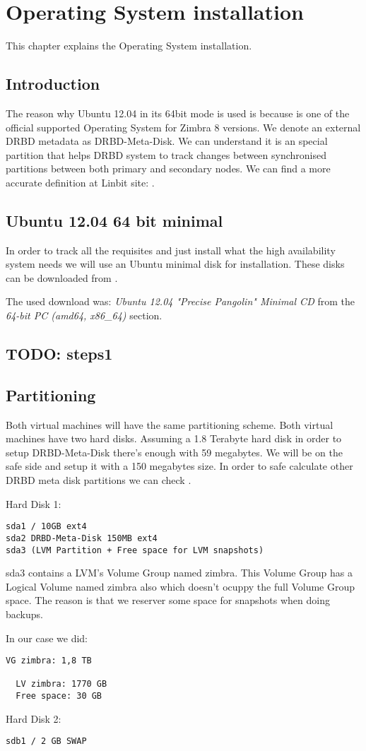 

\chapter{Operating System installation}
This chapter explains the Operating System installation.

\section {Introduction}
The reason why Ubuntu 12.04 in its 64bit mode is used is because is one of the official supported Operating System for Zimbra 8 versions. We denote an external DRBD metadata as DRBD-Meta-Disk. We can understand it is an special partition that helps DRBD system to track changes between synchronised partitions between both primary and secondary nodes. We can find a more accurate definition at Linbit site: \cite{LinbitDRBDInternals}.

\section {Ubuntu 12.04 64 bit minimal}
In order to track all the requisites and just install what the high availability system needs we will use an Ubuntu minimal disk for installation. These disks can be downloaded from \cite{UbuntuMinimalDisk}.

The used download was: \textit{Ubuntu 12.04 "Precise Pangolin" Minimal CD} from the \textit{64-bit PC (amd64, x86\_64)} section. 

\section {TODO: steps1}
\section {Partitioning}
Both virtual machines will have the same partitioning scheme. Both virtual machines have two hard disks.
Assuming a 1.8 Terabyte hard disk in order to setup DRBD-Meta-Disk there's enough with 59 megabytes. We will be on the safe side and setup it with a 150 megabytes size. In order to safe calculate other DRBD meta disk partitions we can check \cite{LinbitDRBDInternals}.

Hard Disk 1:
\begin{verbatim}
sda1 / 10GB ext4
sda2 DRBD-Meta-Disk 150MB ext4
sda3 (LVM Partition + Free space for LVM snapshots)
\end{verbatim}

sda3 contains a LVM's Volume Group named zimbra.
This Volume Group has a Logical Volume named zimbra also which doesn't ocuppy the full Volume Group space. The reason is that we reserver some space for snapshots when doing backups.

In our case we did:
\begin{verbatim}
VG zimbra: 1,8 TB

  LV zimbra: 1770 GB
  Free space: 30 GB
\end{verbatim}


Hard Disk 2:
\begin{verbatim}
sdb1 / 2 GB SWAP
\end{verbatim}
